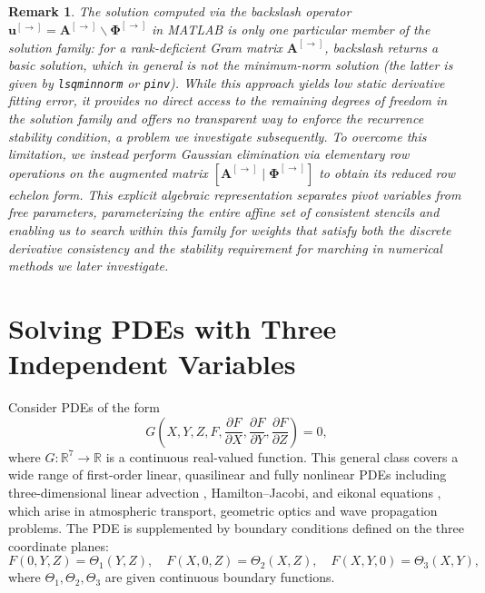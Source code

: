 \documentclass[pdflatex,sn-mathphys-num]{sn-jnl}%
\newcommand{\rev}[1]{\textcolor{red}{#1}}
\theoremstyle{thmstyleone}%
\theoremstyle{thmstyletwo}%
\newtheorem{remark}{Remark}%
\theoremstyle{thmstylethree}%
\begin{document}
{\begin{remark}
The solution computed via the backslash operator $\boldsymbol{u}^{[\to]}=\boldsymbol{A}^{[\to]} \backslash \boldsymbol{\Phi}^{[\to]}$ in MATLAB is only one particular member of the solution family: for a rank-deficient Gram matrix $\boldsymbol{A}^{[\to]}$, backslash returns a basic solution, which in general is not the minimum-norm solution (the latter is given by \texttt{lsqminnorm} or \texttt{pinv}). While this approach yields low static derivative fitting error, it provides no direct access to the remaining degrees of freedom in the solution family and offers no transparent way to enforce the recurrence stability condition,  a problem we investigate subsequently. To overcome this limitation, we instead perform Gaussian elimination via elementary row operations on the augmented matrix $[\boldsymbol{A}^{[\to]} \mid \boldsymbol{\Phi}^{[\to]}]$ to obtain its reduced row echelon form. This explicit algebraic representation separates pivot variables from free parameters, parameterizing the entire affine set of consistent stencils and enabling us to search within this family for weights that satisfy both the discrete derivative consistency and the stability requirement for marching in numerical methods we later investigate.
\end{remark}
\section{Solving PDEs with Three Independent Variables}\rev{\label{sec:pde3d}}
Consider PDEs of the form
\begin{equation}
G\left(X,Y,Z,F,\frac{\partial F}{\partial X},\frac{\partial F}{\partial Y},\frac{\partial F}{\partial Z}\right)=0,
\label{eq:3d-pde-general}
\end{equation}
where $G:\mathbb{R}^7\to\mathbb{R}$ is a continuous real-valued function. This general class covers a wide range of first-order linear, quasilinear and fully nonlinear PDEs including three-dimensional linear advection \cite{Benson2025,Peters2007}, Hamilton--Jacobi, and eikonal equations \cite{Kao2005}, which arise in atmospheric transport, geometric optics and wave propagation problems. The PDE is supplemented by boundary conditions defined on the three coordinate planes:
\begin{equation}
F(0,Y,Z)=\Theta_1(Y,Z),\quad
F(X,0,Z)=\Theta_2(X,Z),\quad
F(X,Y,0)=\Theta_3(X,Y),
\end{equation}
where $\Theta_1,\Theta_2,\Theta_3$ are given continuous boundary functions.

}
\end{document}

